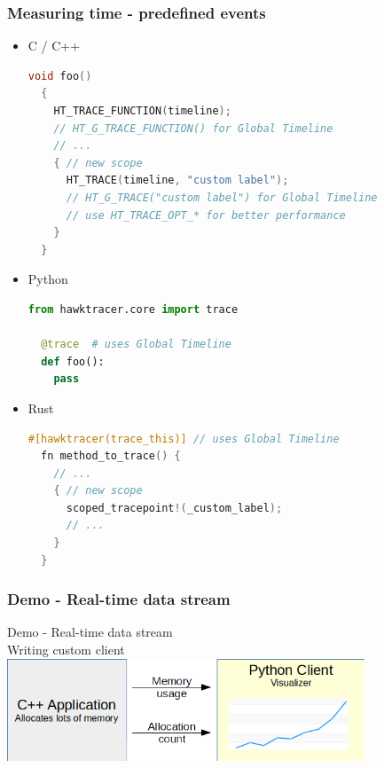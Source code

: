 \documentclass{beamer}
\begin{document}
\begin{frame}[fragile]
  \frametitle{Measuring time - predefined events}
  \begin{itemize}
    \item C / C++
      \begin{lstlisting}[language=C++,basicstyle=\tiny]
  void foo()
  {
    HT_TRACE_FUNCTION(timeline);
    // HT_G_TRACE_FUNCTION() for Global Timeline
    // ...
    { // new scope
      HT_TRACE(timeline, "custom label");
      // HT_G_TRACE("custom label") for Global Timeline
      // use HT_TRACE_OPT_* for better performance
    }
  }
    \end{lstlisting}
  \item Python
    \begin{lstlisting}[language=Python,basicstyle=\tiny]
  from hawktracer.core import trace

  @trace  # uses Global Timeline
  def foo():
    pass
    \end{lstlisting}
  \item Rust
    \begin{lstlisting}[language=C,basicstyle=\tiny]
  #[hawktracer(trace_this)] // uses Global Timeline
  fn method_to_trace() {
    // ...
    { // new scope
      scoped_tracepoint!(_custom_label);
      // ...
    }
  }
    \end{lstlisting}
  \end{itemize}
\end{frame}


\begin{frame}
  \frametitle{Demo - Real-time data stream}
  \begin{center}
    \Huge Demo - Real-time data stream \\
    \LARGE Writing custom client
    \vspace{1em} \\
    \includegraphics[width=0.8\textwidth]{img/resource-usage.png} \\
  \end{center}
\end{frame}
\end{document}
